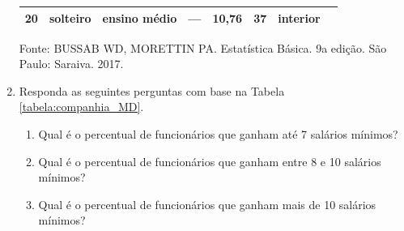 \documentclass{article}
\begin{document}
\begin{enumerate}
\begin{table}[thp]
\begin{tabular}{cccccccc}
		20 & solteiro & ensino médio & — & 10,76 & 37 & interior \\
		\hline
	\end{tabular}
	Fonte: BUSSAB WD, MORETTIN PA. Estatística Básica. 9a edição. São Paulo: Saraiva. 2017.
\end{table}	

	\item Responda as seguintes perguntas com base na Tabela \ref{tabela:companhia_MD}.
	\begin{enumerate}
		\item Qual é o percentual de funcionários que ganham até 7 salários mínimos?
		\item Qual é o percentual de funcionários que ganham entre 8 e 10 salários mínimos?
		\item Qual é o percentual de funcionários que ganham mais de 10 salários mínimos?
	\end{enumerate}
		

\end{enumerate}
\end{document}
